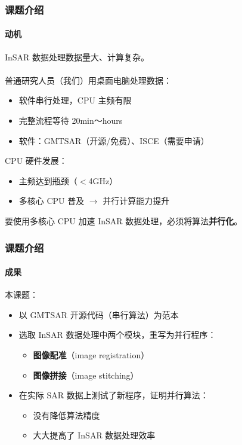 \documentclass{beamer}
\begin{document}
\begin{frame}
    \frametitle{课题介绍}
    \framesubtitle{动机}

    InSAR 数据处理数据量大、计算复杂。\\~\\

    普通研究人员（我们）用桌面电脑处理数据：
    \begin{itemize}
        \setlength\itemsep{-0.1em}
        \item 软件串行处理，CPU 主频有限
        \item 完整流程等待 20min～hours
        \item 软件：GMTSAR（开源/免费）、ISCE（需要申请）
    \end{itemize}

    CPU 硬件发展：
    \begin{itemize}
        \setlength\itemsep{-0.1em}
        \item 主频达到瓶颈（$<$4GHz）
        \item 多核心 CPU 普及 $\to$ 并行计算能力提升
    \end{itemize}

    要使用多核心 CPU 加速 InSAR 数据处理，必须将算法\textbf{并行化}。
\end{frame}

\begin{frame}
    \frametitle{课题介绍}
    \framesubtitle{成果}

    本课题：
    \begin{itemize}
        \item 以 GMTSAR 开源代码（串行算法）为范本
        \item 选取 InSAR 数据处理中两个模块，重写为并行程序：
        \begin{itemize}
            \item \textbf{图像配准}（image registration）
            \item \textbf{图像拼接}（image stitching）
        \end{itemize}
        \item 在实际 SAR 数据上测试了新程序，证明并行算法：
        \begin{itemize}
            \item 没有降低算法精度
            \item 大大提高了 InSAR 数据处理效率
        \end{itemize}
    \end{itemize}
\end{frame}
\end{document}
